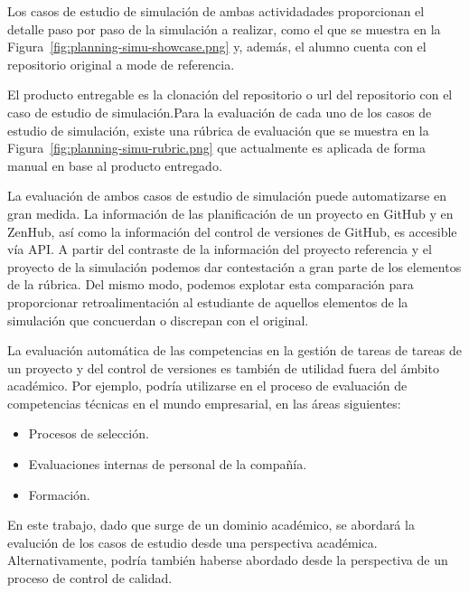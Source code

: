 Los casos de estudio de simulación de ambas actividadades proporcionan el  detalle paso por paso de la simulación a realizar, como el que se muestra en la Figura~\ref{fig:planning-simu-showcase.png} y, además, el alumno cuenta con el repositorio original a mode de referencia. 


El producto entregable es la clonación del repositorio o url del repositorio con el caso de estudio de simulación.Para la evaluación de cada uno de los casos de estudio de simulación, existe una rúbrica de evaluación que se muestra en la  Figura~\ref{fig:planning-simu-rubric.png} que actualmente es aplicada de forma manual en base al producto entregado.


La evaluación de ambos casos de estudio de simulación puede automatizarse en gran medida. La información de las planificación de un proyecto en GitHub y en ZenHub, así como la información  del control de versiones de GitHub, es accesible vía API. A partir del contraste de la información del proyecto referencia y el proyecto de la simulación podemos dar contestación a gran parte de los elementos de la rúbrica. Del mismo modo, podemos explotar esta comparación para proporcionar retroalimentación al estudiante de aquellos elementos de la simulación que concuerdan o discrepan con el original.

La evaluación  automática de las competencias en la  gestión de tareas de tareas de un proyecto y del control de versiones es también de  utilidad fuera del ámbito académico. Por ejemplo, podría utilizarse en el proceso de evaluación de competencias técnicas en el mundo empresarial, en las áreas siguientes:

\begin{itemize}
	\item Procesos de selección.
	\item Evaluaciones internas de personal de la compañía.
	\item Formación.
\end{itemize}

En este trabajo, dado que surge de un dominio académico, se abordará la evalución de los casos de estudio desde una perspectiva académica.  Alternativamente, podría también haberse abordado desde la perspectiva de un proceso de control de calidad.